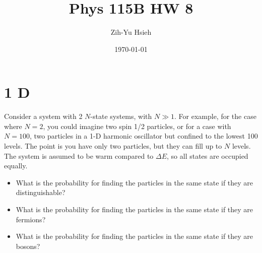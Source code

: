 \documentclass{article}
\title{Phys 115B HW 8}
\author{Zih-Yu Hsieh}
\date{\today}
\begin{document}
\maketitle

\section*{1 D}

\begin{ques}
Consider a system with 2 $N$-state systems, with $N \gg 1$. For example, for the case where
$N = 2$, you could imagine two spin 1/2 particles, or for a case with $N = 100$, two particles
in a 1-D harmonic oscillator but confined to the lowest 100 levels. The point is you have
only two particles, but they can fill up to $N$ levels. The system is assumed to be warm
compared to $\Delta E$, so all states are occupied equally.

\begin{itemize}
    \item[(a)] What is the probability for finding the particles in the same state if they are distinguishable?

    \item[(b)] What is the probability for finding the particles in the same state if they are fermions?

    \item[(c)] What is the probability for finding the particles in the same state if they are bosons?
\end{itemize}
\end{ques}
\end{document}
